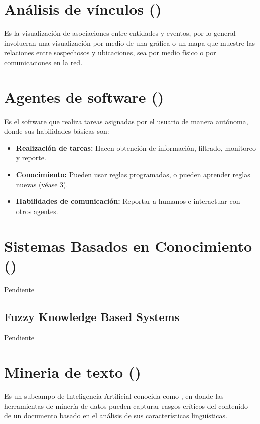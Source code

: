 
\section{Análisis de vínculos ()}
Es la visualización de asociaciones entre entidades y eventos, por lo general involucran una visualización por medio de una gráfica o un mapa que muestre las relaciones entre sospechosos y ubicaciones, sea por medio físico o por comunicaciones en la red.


\section{Agentes de software ()}
Es el software que realiza tareas asignadas por el usuario de manera autónoma, donde sus habilidades básicas son:
\begin{itemize}
\item \textbf{Realización de tareas:} Hacen obtención de información, filtrado, monitoreo y reporte.
\item \textbf{Conocimiento:} Pueden usar reglas programadas, o pueden aprender reglas nuevas (véase \ref{secKBS}).
\item \textbf{Habilidades de comunicación:} Reportar a humanos e interactuar con otros agentes.
\end{itemize}


\section{Sistemas Basados en Conocimiento ()} \label{secKBS}
Pendiente

\subsection{Fuzzy Knowledge Based Systems}
Pendiente


\section{Mineria de texto ()} \label{secNLP}
Es un subcampo de Inteligencia Artificial conocida como , en donde las herramientas de minería de datos pueden capturar rasgos críticos del contenido de un documento basado en el análisis de sus características lingüísticas.


